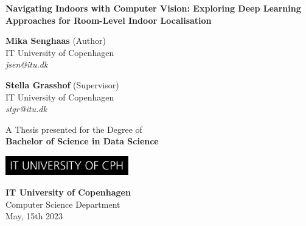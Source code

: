 \begin{titlepage}
  \begin{center}

    \vspace*{1cm}

    \textbf{\LARGE
    Navigating Indoors with Computer Vision: Exploring Deep Learning Approaches
    for Room-Level Indoor Localisation
    }

    \vspace{1.5cm}

    \begin{minipage}[t]{5cm}
      \centering
      \textbf{Mika Senghaas} (Author) \\
      IT University of Copenhagen \\
      \textit{jsen@itu.dk}
    \end{minipage}
    \hspace{1cm}
    \begin{minipage}[t]{5cm}
      \centering
      \textbf{Stella Grasshof} (Supervisor) \\
      IT University of Copenhagen \\
      \textit{stgr@itu.dk}
    \end{minipage}

    \vfill

    A Thesis presented for the Degree of \\
    \textbf{Bachelor of Science in Data Science}

    \vspace{0.8cm}

    \includegraphics[width=0.4\textwidth]{figures/itu.jpg}

    \vspace{0.8cm}

    \textbf{IT University of Copenhagen}\\
    Computer Science Department\\
    \vspace{.5cm}
    May, 15th 2023

  \end{center}
\end{titlepage}
